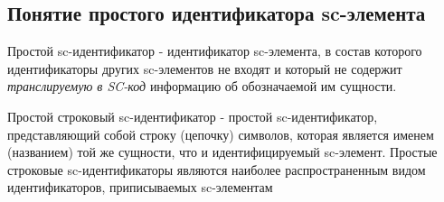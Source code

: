 \subsection{Понятие простого идентификатора sc-элемента}

Простой sc-идентификатор - идентификатор sc-элемента, в состав которого идентификаторы других sc-элементов не входят и который не содержит \textit{транслируемую в SC-код} информацию об обозначаемой им сущности. 

Простой строковый sc-идентификатор - простой sc-идентификатор, представляющий собой строку (цепочку) символов, которая является именем (названием) той же сущности, что и идентифицируемый sc-элемент. Простые строковые sc-идентификаторы являются наиболее распространенным видом идентификаторов, приписываемых sc-элементам

